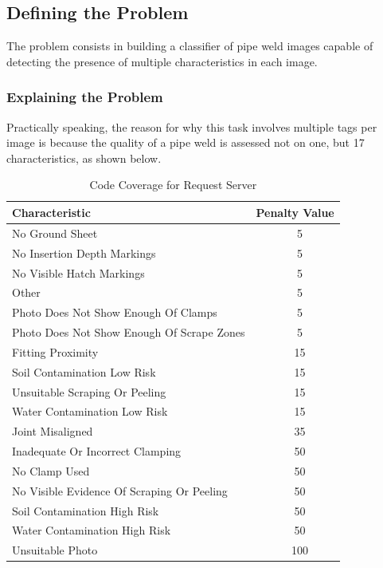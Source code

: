 \documentclass[a4paper,11pt]{article}
\begin{document}
\subsection{Defining the Problem}

The problem consists in building a classifier of pipe weld images capable of detecting the presence of multiple characteristics in each image. 

\subsubsection{Explaining the Problem}

Practically speaking, the reason for why this task involves multiple tags per image is because the quality of a pipe weld is assessed not on one, but 17 characteristics, as shown below.

\begin{table}[h]
   \centering
    \begin{tabular}{|l|c|}
    \hline
    Characteristic                 & Penalty Value  \\ \hline
    No Ground Sheet  & ~  5 \\
    No Insertion Depth Markings  & ~ 5 \\
    No Visible Hatch Markings  & ~ 5 \\
    Other  & ~  5 \\
    Photo Does Not Show Enough Of Clamps  & ~ 5 \\
    Photo Does Not Show Enough Of Scrape Zones  & ~ 5 \\
    Fitting Proximity  & ~  15 \\
    Soil Contamination Low Risk  & ~ 15 \\
    Unsuitable Scraping Or Peeling  & ~ 15 \\
    Water Contamination Low Risk  & ~ 15 \\
    Joint Misaligned  & ~  35 \\
    Inadequate Or Incorrect Clamping  & ~ 50 \\
    No Clamp Used  & ~  50 \\
    No Visible Evidence Of Scraping Or Peeling  & ~ 50 \\
    Soil Contamination High Risk  & ~ 50 \\
    Water Contamination High Risk  & ~ 50 \\
    Unsuitable Photo  & ~ 100 \\
    \hline
    \end{tabular}
    \caption {Code Coverage for Request Server}
\end{table} 
\end{document}
